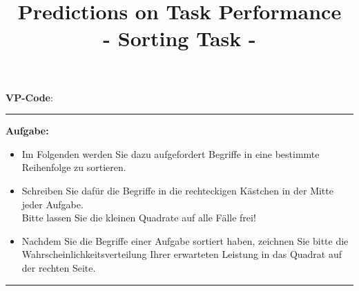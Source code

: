 \documentclass[
ngerman,
accentcolor=9c,%
identbarcolor=9c,
]{tudaexercise}
\title{Predictions on Task Performance\\- Sorting Task -}
\begin{document}
\maketitle
\vspace{-3mm}


\vspace{-1mm}

\textbf{VP-Code}: \fbox{\color{white}\rule{2cm}{2.5mm}\color{black}}

\par\noindent\rule{\textwidth}{0.4pt}

\textbf{Aufgabe:}
\begin{itemize}
	\item Im Folgenden werden Sie dazu aufgefordert Begriffe in eine bestimmte Reihenfolge zu sortieren.
	\item Schreiben Sie dafür die Begriffe in die rechteckigen Kästchen in der Mitte jeder Aufgabe.\\Bitte lassen Sie die kleinen Quadrate auf alle Fälle frei!
	\item Nachdem Sie die Begriffe einer Aufgabe sortiert haben, zeichnen Sie bitte die Wahrscheinlichkeitsverteilung Ihrer erwarteten Leistung in das  Quadrat auf der rechten Seite.
\end{itemize}

\par\noindent\rule{\textwidth}{0.4pt}
\end{document}
